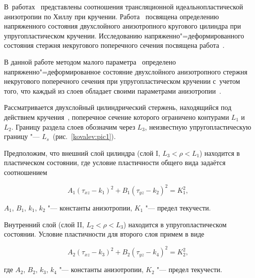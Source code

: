 В~работах~\cite{kovalev:bibl_3,kovalev:bibl_9} представлены соотношения трансляционной идеальнопластической анизотропии по Хиллу при кручении. Работа~\cite{kovalev:bibl_8} посвящена определению напряженного состояния двухслойного анизотропного кругового цилиндра при упругопластическом кручении. Исследованию напряженно"=деформированного состояния стержня некругового поперечного сечения посвящена работа~\cite{kovalev:bibl_6}.



В данной работе методом малого параметра~\cite{kovalev:bibl_2,kovalev:bibl_10} определено напряженно"=деформированное состояние двухслойного анизотропного стержня некругового поперечного сечения при упругопластическом кручении с~учетом того, что каждый из слоев обладает своими параметрами анизотропии~\cite{kovalev:bibl_13,kovalev:bibl_4}.



Рассматривается двухслойный цилиндрический стержень, находящийся под действием кручения~\cite{kovalev:bibl_5}, поперечное сечение которого ограничено контурами  $L_1$ и $L_2$. Границу раздела слоев обозначим через $L_3$, неизвестную упругопластическую границу "--- $L_s$~(рис.~\ref{kovalev:pic1}).





Предположим, что внешний слой цилиндра (слой I, $L_3<\rho<L_1$) находится в пластическом состоянии, где условие пластичности общего вида задаётся соотношением

\begin{equation}

\label{kovalev:eq_1}

A_1 (\tau_{xz}-k_1 )^2+B_1 (\tau_{yz}-k_2 )^2=K_1^2,

\end{equation}

$A_1$, $B_1$, $k_1$, $k_2$ "--- константы анизотропии, $K_1$ "--- предел текучести.

Внутренний слой (слой II,  $L_2<\rho<L_3$) находится в упругопластическом состоянии. Условие пластичности для второго слоя примем в виде

\begin{equation}

\label{kovalev:eq_2}

A_2(\tau_{xz}-k_3 )^2+B_2 (\tau_{yz}-k_4)^2=K_2^2,

\end{equation}

где $A_2$, $B_2$, $k_3$, $k_4$ "--- константы анизотропии, $K_2$ "--- предел текучести.





